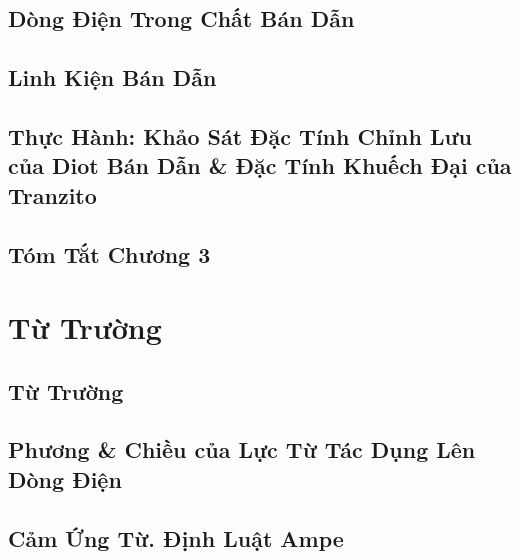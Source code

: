 \documentclass[oneside]{book}
\numberwithin{equation}{section}
\begin{document}

\section{Dòng Điện Trong Chất Bán Dẫn}


\section{Linh Kiện Bán Dẫn}


\section{Thực Hành: Khảo Sát Đặc Tính Chỉnh Lưu của Diot Bán Dẫn \& Đặc Tính Khuếch Đại của Tranzito}


\section{Tóm Tắt Chương 3}


\chapter{Từ Trường}

\section{Từ Trường}


\section{Phương \& Chiều của Lực Từ Tác Dụng Lên Dòng Điện}


\section{Cảm Ứng Từ. Định Luật Ampe}
\end{document}
